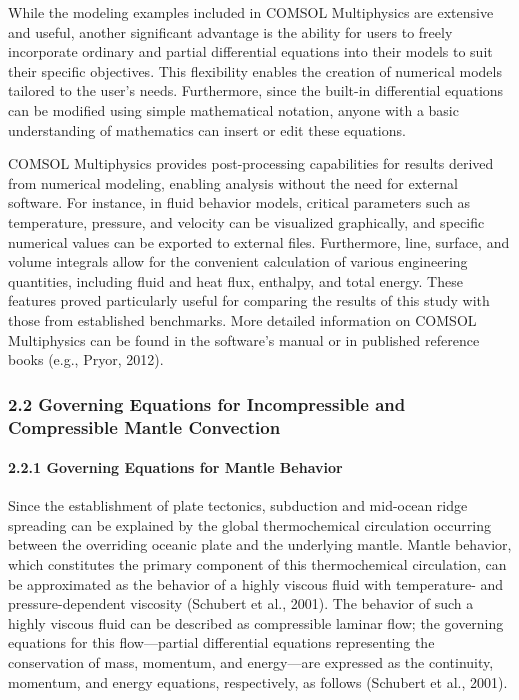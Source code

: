 While the modeling examples included in COMSOL Multiphysics are extensive and useful, another significant advantage is the ability for users to freely incorporate ordinary and partial differential equations into their models to suit their specific objectives. This flexibility enables the creation of numerical models tailored to the user's needs. Furthermore, since the built-in differential equations can be modified using simple mathematical notation, anyone with a basic understanding of mathematics can insert or edit these equations.

COMSOL Multiphysics provides post-processing capabilities for results derived from numerical modeling, enabling analysis without the need for external software. For instance, in fluid behavior models, critical parameters such as temperature, pressure, and velocity can be visualized graphically, and specific numerical values can be exported to external files. Furthermore, line, surface, and volume integrals allow for the convenient calculation of various engineering quantities, including fluid and heat flux, enthalpy, and total energy. These features proved particularly useful for comparing the results of this study with those from established benchmarks. More detailed information on COMSOL Multiphysics can be found in the software's manual or in published reference books (e.g., Pryor, 2012).

\subsubsection{2.2 Governing Equations for Incompressible and Compressible Mantle Convection}

\paragraph{2.2.1 Governing Equations for Mantle Behavior}

Since the establishment of plate tectonics, subduction and mid-ocean ridge spreading can be explained by the global thermochemical circulation occurring between the overriding oceanic plate and the underlying mantle. Mantle behavior, which constitutes the primary component of this thermochemical circulation, can be approximated as the behavior of a highly viscous fluid with temperature- and pressure-dependent viscosity (Schubert et al., 2001). The behavior of such a highly viscous fluid can be described as compressible laminar flow; the governing equations for this flow—partial differential equations representing the conservation of mass, momentum, and energy—are expressed as the continuity, momentum, and energy equations, respectively, as follows (Schubert et al., 2001).

